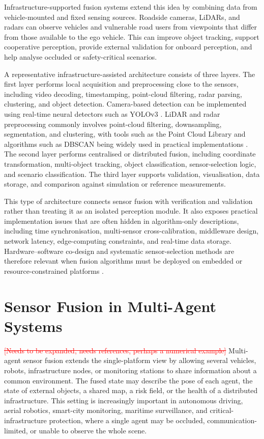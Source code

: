 \documentclass{ieeeaccess}
\newcommand{\deleted}[1]{\textcolor{red}{\sout{#1}}}
\begin{document}
Infrastructure-supported fusion systems extend this idea by combining data from vehicle-mounted and fixed sensing sources. Roadside cameras, LiDARs, and radars can observe vehicles and vulnerable road users from viewpoints that differ from those available to the ego vehicle. This can improve object tracking, support cooperative perception, provide external validation for onboard perception, and help analyse occluded or safety-critical scenarios.

A representative infrastructure-assisted architecture consists of three layers. The first layer performs local acquisition and preprocessing close to the sensors, including video decoding, timestamping, point-cloud filtering, radar parsing, clustering, and object detection. Camera-based detection can be implemented using real-time neural detectors such as YOLOv3 \cite{redmon_yolov3_2018}. LiDAR and radar preprocessing commonly involves point-cloud filtering, downsampling, segmentation, and clustering, with tools such as the Point Cloud Library and algorithms such as DBSCAN being widely used in practical implementations \cite{rusu_pcl_2011, ester_dbscan_1996}. The second layer performs centralised or distributed fusion, including coordinate transformation, multi-object tracking, object classification, sensor-selection logic, and scenario classification. The third layer supports validation, visualisation, data storage, and comparison against simulation or reference measurements.

This type of architecture connects sensor fusion with verification and validation rather than treating it as an isolated perception module. It also exposes practical implementation issues that are often hidden in algorithm-only descriptions, including time synchronisation, multi-sensor cross-calibration, middleware design, network latency, edge-computing constraints, and real-time data storage. Hardware--software co-design and systematic sensor-selection methods are therefore relevant when fusion algorithms must be deployed on embedded or resource-constrained platforms \cite{deliparaschos_fpga_2016}.

\section{Sensor Fusion in Multi-Agent Systems}
\label{sec:MAS}
\deleted{[Needs to be expanded, needs references, perhaps a numerical example]} %
Multi-agent sensor fusion extends the single-platform view by allowing several vehicles, robots, infrastructure nodes, or monitoring stations to share information about a common environment. The fused state may describe the pose of each agent, the state of external objects, a shared map, a risk field, or the health of a distributed infrastructure. This setting is increasingly important in autonomous driving, aerial robotics, smart-city monitoring, maritime surveillance, and critical-infrastructure protection, where a single agent may be occluded, communication-limited, or unable to observe the whole scene.
\end{document}
